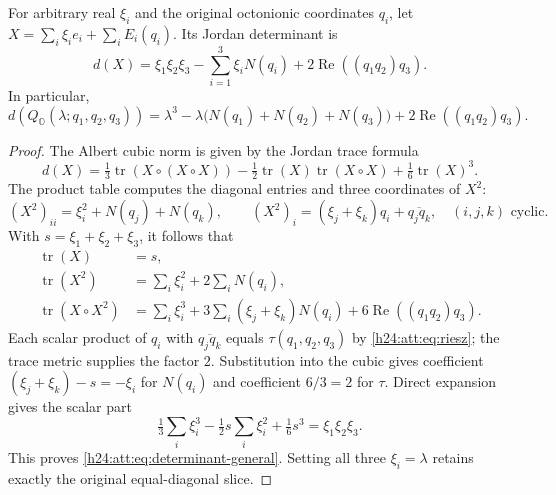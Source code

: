 \begin{proposition}\label{h24:att:prop:determinant}
For arbitrary real $\xi_i$ and the original octonionic coordinates
$q_i$, let $X=\sum_i\xi_i e_i+\sum_iE_i(q_i)$. Its Jordan determinant is
\begin{equation}
 d(X)=\xi_1\xi_2\xi_3-\sum_{i=1}^3\xi_iN(q_i)
                    +2\operatorname{Re}((q_1q_2)q_3).
 \label{h24:att:eq:determinant-general}
\end{equation}
In particular,
\[
 d(Q_{\mathbb O}(\lambda;q_1,q_2,q_3))
 =\lambda^3-\lambda\bigl(N(q_1)+N(q_2)+N(q_3)\bigr)
                  +2\operatorname{Re}((q_1q_2)q_3).
\]
\end{proposition}

\begin{proof}
The Albert cubic norm is given by the Jordan trace formula
\[
 d(X)=\tfrac13\operatorname{tr}(X\circ(X\circ X))
 -\tfrac12\operatorname{tr}(X)\operatorname{tr}(X\circ X)
 +\tfrac16\operatorname{tr}(X)^3.
\]
The product table computes the diagonal entries and three coordinates
of $X^2$:
\[
 (X^2)_{ii}=\xi_i^2+N(q_j)+N(q_k),\qquad
 (X^2)_i=(\xi_j+\xi_k)q_i+\overline{q_jq_k},
 \quad(i,j,k)\text{ cyclic}.
\]
With $s=\xi_1+\xi_2+\xi_3$, it follows that
\begin{align*}
 \operatorname{tr}(X)&=s,\\
 \operatorname{tr}(X^2)&=\sum_i\xi_i^2+2\sum_iN(q_i),\\
 \operatorname{tr}(X\circ X^2)
 &=\sum_i\xi_i^3+3\sum_i(\xi_j+\xi_k)N(q_i)
                     +6\operatorname{Re}((q_1q_2)q_3).
\end{align*}
Each scalar product of $q_i$ with $\overline{q_jq_k}$ equals
$\tau(q_1,q_2,q_3)$ by \eqref{h24:att:eq:riesz}; the trace metric supplies
the factor $2$. Substitution into the cubic gives coefficient
$(\xi_j+\xi_k)-s=-\xi_i$ for $N(q_i)$ and coefficient $6/3=2$ for
$\tau$. Direct expansion gives the scalar part
\[
 \tfrac13\sum_i\xi_i^3-\tfrac12s\sum_i\xi_i^2+\tfrac16s^3
 =\xi_1\xi_2\xi_3.
\]
This proves \eqref{h24:att:eq:determinant-general}. Setting all three
$\xi_i=\lambda$ retains exactly the original equal-diagonal slice.
\end{proof}

